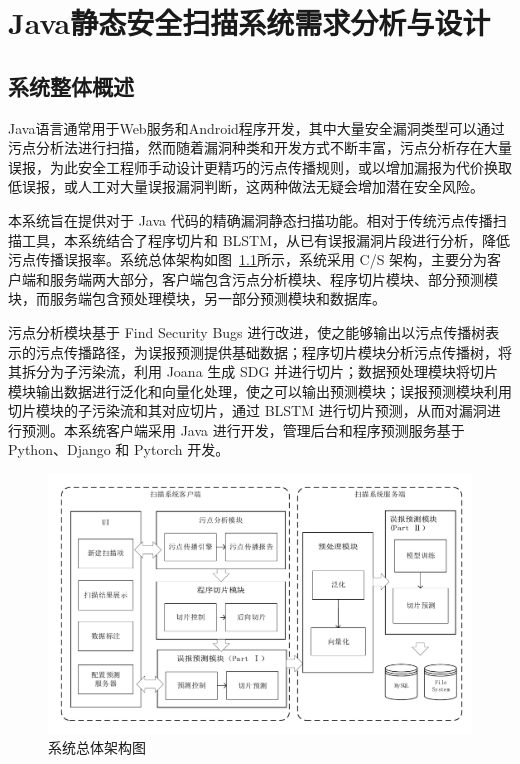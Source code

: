 \chapter{Java静态安全扫描系统需求分析与设计}
\section{系统整体概述}
Java语言通常用于Web服务和Android程序开发，其中大量安全漏洞类型可以通过污点分析法进行扫描，然而随着漏洞种类和开发方式不断丰富，污点分析存在大量误报，为此安全工程师手动设计更精巧的污点传播规则，或以增加漏报为代价换取低误报，或人工对大量误报漏洞判断，这两种做法无疑会增加潜在安全风险。

本系统旨在提供对于 Java 代码的精确漏洞静态扫描功能。相对于传统污点传播扫描工具，本系统结合了程序切片和 BLSTM，从已有误报漏洞片段进行分析，降低污点传播误报率。系统总体架构如图~\ref{overview}所示，系统采用 C/S 架构，主要分为客户端和服务端两大部分，客户端包含污点分析模块、程序切片模块、部分预测模块，而服务端包含预处理模块，另一部分预测模块和数据库。

污点分析模块基于 Find Security Bugs 进行改进，使之能够输出以污点传播树表示的污点传播路径，为误报预测提供基础数据；程序切片模块分析污点传播树，将其拆分为子污染流，利用 Joana 生成 SDG 并进行切片；数据预处理模块将切片模块输出数据进行泛化和向量化处理，使之可以输出预测模块；误报预测模块利用切片模块的子污染流和其对应切片，通过 BLSTM 进行切片预测，从而对漏洞进行预测。本系统客户端采用 Java 进行开发，管理后台和程序预测服务基于 Python、Django 和 Pytorch 开发。

\begin{figure}[htbp]
	\centering
	\includegraphics[width=5in]{FIGs/chapter3/system-architecture.pdf}
	\caption{系统总体架构图}\label{overview}
\end{figure}

